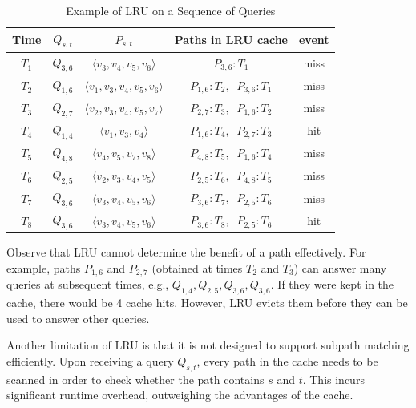 \documentclass{sig-alternate}
\begin{document}
\begin{table}[hbt]
\center
\begin{tabular}{|@{ }c@{ }|@{ }c@{ }|@{ }c@{ }||@{ }c@{ }|@{ }c@{ }|}\hline
    Time	&	$Q_{s,t}$	& $P_{s,t}$ &  Paths in LRU cache & event  \\\hline
    $T_1$	&	$Q_{3,6}$ 	& $\langle v_3,v_4,v_5,v_6 \rangle$ & $P_{3,6}:T_1$ & miss  \\
    $T_2$	&	$Q_{1,6}$ 	& $\langle v_1,v_3,v_4,v_5,v_6 \rangle$ & $P_{1,6}:T_2, \;\; P_{3,6}:T_1$ & miss \\
    $T_3$	&	$Q_{2,7}$ 	& $\langle v_2,v_3,v_4,v_5,v_7 \rangle$ & $P_{2,7}:T_3, \;\; P_{1,6}:T_2$ & miss \\
    $T_4$	&	$Q_{1,4}$ 	& $\langle v_1,v_3,v_4 \rangle$ & $P_{1,6}:T_4, \;\; P_{2,7}:T_3$ & hit \\
    $T_5$	&	$Q_{4,8}$ 	& $\langle v_4,v_5,v_7,v_8 \rangle$ & $P_{4,8}:T_5, \;\; P_{1,6}:T_4$ & miss \\
    $T_6$	&	$Q_{2,5}$ 	& $\langle v_2,v_3,v_4,v_5 \rangle$ & $P_{2,5}:T_6, \;\; P_{4,8}:T_5$ & miss \\
    $T_7$	&	$Q_{3,6}$ 	& $\langle v_3,v_4,v_5,v_6 \rangle$ & $P_{3,6}:T_7, \;\; P_{2,5}:T_6$ & miss \\
    $T_8$	&	$Q_{3,6}$ 	& $\langle v_3,v_4,v_5,v_6 \rangle$ & $P_{3,6}:T_8, \;\; P_{2,5}:T_6$ & hit \\\hline
\end{tabular}
\caption{Example of LRU on a Sequence of Queries}
\label{tab:queries}
\end{table}



Observe that LRU cannot determine the benefit of a path effectively.
For example, paths $P_{1,6}$ and $P_{2,7}$ (obtained at times $T_2$ and $T_3$)
can answer many queries at subsequent times, e.g., $Q_{1,4}, Q_{2,5}, Q_{3,6}, Q_{3,6}$.
If they were kept in the cache, there would be 4 cache hits.
However, LRU evicts them before they can be used to answer other queries.


Another limitation of LRU is that it is not designed to support subpath matching efficiently.
Upon receiving a query $Q_{s,t}$, every path in the cache needs to be scanned in order to check whether the path
contains $s$ and $t$. This incurs significant runtime overhead, outweighing the advantages of the cache.



\end{document}
